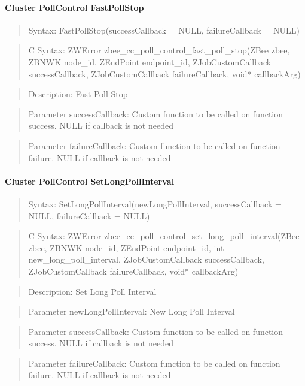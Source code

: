\paragraph{Cluster PollControl FastPollStop}
\begin{quote}Syntax: FastPollStop(successCallback = NULL, failureCallback = NULL)\end{quote}
\begin{quote}C Syntax: ZWError zbee\_cc\_poll\_control\_fast\_poll\_stop(ZBee zbee, ZBNWK node\_id, ZEndPoint endpoint\_id, ZJobCustomCallback successCallback, ZJobCustomCallback failureCallback, void* callbackArg)\end{quote}
\begin{quote}Description: Fast Poll Stop\end{quote}
\begin{quote}Parameter successCallback: Custom function to be called on function success. NULL if callback is not needed\end{quote}
\begin{quote}Parameter failureCallback: Custom function to be called on function failure. NULL if callback is not needed\end{quote}


\paragraph{Cluster PollControl SetLongPollInterval}
\begin{quote}Syntax: SetLongPollInterval(newLongPollInterval, successCallback = NULL, failureCallback = NULL)\end{quote}
\begin{quote}C Syntax: ZWError zbee\_cc\_poll\_control\_set\_long\_poll\_interval(ZBee zbee, ZBNWK node\_id, ZEndPoint endpoint\_id, int new\_long\_poll\_interval, ZJobCustomCallback successCallback, ZJobCustomCallback failureCallback, void* callbackArg)\end{quote}
\begin{quote}Description: Set Long Poll Interval\end{quote}
\begin{quote}Parameter newLongPollInterval: New Long Poll Interval\end{quote}
\begin{quote}Parameter successCallback: Custom function to be called on function success. NULL if callback is not needed\end{quote}
\begin{quote}Parameter failureCallback: Custom function to be called on function failure. NULL if callback is not needed\end{quote}


